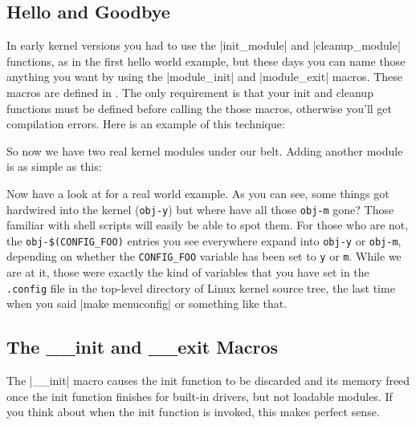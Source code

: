 \documentclass[10pt, oneside]{book}
\begin{document}
\subsection{Hello and Goodbye}
\label{hello_n_goodbye}
In early kernel versions you had to use the \cpp|init_module| and \cpp|cleanup_module| functions, as in the first hello world example, but these days you can name those anything you want by using the \cpp|module_init| and \cpp|module_exit| macros.
These macros are defined in .
The only requirement is that your init and cleanup functions must be defined before calling the those macros, otherwise you'll get compilation errors.
Here is an example of this technique:


So now we have two real kernel modules under our belt. Adding another module is as simple as this:


Now have a look at  for a real world example.
As you can see, some things got hardwired into the kernel (\verb|obj-y|) but where have all those \verb|obj-m| gone?
Those familiar with shell scripts will easily be able to spot them.
For those who are not, the \verb|obj-$(CONFIG_FOO)| entries you see everywhere expand into \verb|obj-y| or \verb|obj-m|, depending on whether the \verb|CONFIG_FOO| variable has been set to \verb|y| or \verb|m|.
While we are at it, those were exactly the kind of variables that you have set in the \verb|.config| file in the top-level directory of Linux kernel source tree, the last time when you said \sh|make menuconfig| or something like that.

\subsection{The \_\_init and \_\_exit Macros}
\label{init_n_exit}
The \cpp|__init| macro causes the init function to be discarded and its memory freed once the init function finishes for built-in drivers, but not loadable modules.
If you think about when the init function is invoked, this makes perfect sense.
\end{document}
